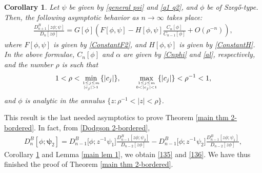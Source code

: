 \documentclass[10pt,a4paper]{amsart}
\numberwithin{equation}{section}
\newtheorem{Corollary}[Theorem]{Corollary}
\newcommand{\al}{\alpha}
\begin{document}
\begin{Corollary}\label{main cor 1}
Let $\psi$ be given by \eqref{general psi} and \eqref{q1 q2}, and $\phi$ be of Szeg\H{o}-type. Then, the following asymptotic behavior as $n \to \infty$ takes place:
			\begin{gather*}%
				\frac{D^{B}_{n+1}[z\phi;\psi]}{D_{n}[z\phi]} = G[\phi] \left( F [\phi,\psi] - H[\phi,\psi] \frac{C_n[\phi]}{C_{n-1}[\phi]} + O(\rho^{-n})\right),
			\end{gather*}
			where $F [\phi,\psi]$ is given by \eqref{ConstantF2}, and $H[\phi,\psi]$ is given by \eqref{ConstantH}.
			In the above formulae, $C_n[\phi]$ and
			$\al$ are given by \eqref{Cnphi} and \eqref{al}, respectively, and the number $\rho$ is such that
\[
1<\rho < \underset{1 \leq j \leq m \atop |c_j|>1}{\min} \{|c_j|\}, \qquad \underset{1 \leq j \leq m \atop 0<|c_j|<1}{\max} \{|c_j|\}<\rho^{-1}<1,
\]
 and $\phi$ is analytic in the annulus $\big\{z\colon \rho^{-1}<|z|<\rho\big\}$.
		\end{Corollary}
		This result is the last needed asymptotics to prove Theorem \ref{main thm 2-bordered}. In fact, from \eqref{Dodgson 2-bordered},
		\begin{gather*}%
			D^B_n[\phi;\boldsymbol{\psi}_2] = D^B_{n-1}\big[\phi;z^{-1}\psi_1\big] \frac{D^B_{n-1}[z\phi;\psi_2]}{D_{n-2}[z \phi]} - D^B_{n-1}\big[\phi;z^{-1}\psi_2\big] \frac{D^B_{n-1}[z\phi;\psi_1]}{D_{n-2}[z \phi]},
		\end{gather*}
		Corollary \ref{main cor 1} and Lemma \ref{main lem 1}, we obtain \eqref{135} and \eqref{136}. We have thus finished the proof of Theorem \ref{main thm 2-bordered}.
		
\end{document}
